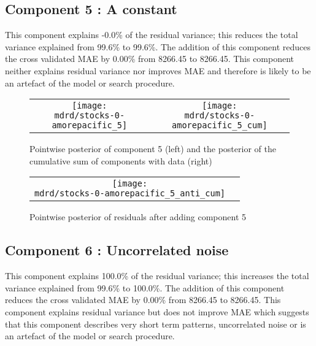 \documentclass{article} %
\begin{document}
\subsection{Component 5 : A constant}



This component explains -0.0\% of the residual variance; this reduces the total variance explained from 99.6\% to 99.6\%.
The addition of this component reduces the cross validated MAE by 0.00\% from 8266.45 to 8266.45.
This component neither explains residual variance nor improves MAE and therefore is likely to be an artefact of the model or search procedure.

\begin{figure}[H]
\newcommand{\wmgd}{0.5\columnwidth}
\newcommand{\hmgd}{3.0cm}
\newcommand{\mdrd}{stocks-0-amorepacific}
\newcommand{\mbm}{\hspace{-0.3cm}}
\begin{tabular}{cc}
\mbm \texttt{[image: \\mdrd/stocks-0-amorepacific\_5]} & \texttt{[image: \\mdrd/stocks-0-amorepacific\_5\_cum]}
\end{tabular}
\caption{Pointwise posterior of component 5 (left) and the posterior of the cumulative sum of components with data (right)}
\label{fig:comp5}
\end{figure}

\begin{figure}[H]
\newcommand{\wmgd}{0.5\columnwidth}
\newcommand{\hmgd}{3.0cm}
\newcommand{\mdrd}{stocks-0-amorepacific}
\newcommand{\mbm}{\hspace{-0.3cm}}
\begin{tabular}{cc}
\mbm \texttt{[image: \\mdrd/stocks-0-amorepacific\_5\_anti\_cum]}
\end{tabular}
\caption{Pointwise posterior of residuals after adding component 5}
\label{fig:comp5}
\end{figure}

\subsection{Component 6 : Uncorrelated noise}



This component explains 100.0\% of the residual variance; this increases the total variance explained from 99.6\% to 100.0\%.
The addition of this component reduces the cross validated MAE by 0.00\% from 8266.45 to 8266.45.
This component explains residual variance but does not improve MAE which suggests that this component describes very short term patterns, uncorrelated noise or is an artefact of the model or search procedure.
\end{document}
